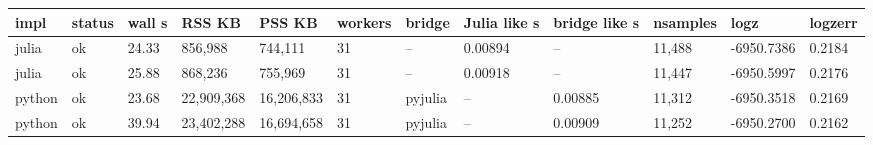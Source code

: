 \begin{tabular}{llllllllllll}
\toprule
impl & status & wall s & RSS KB & PSS KB & workers & bridge & Julia like s & bridge like s & nsamples & logz & logzerr \\
\midrule
julia & ok & 24.33 & 856,988 & 744,111 & 31 & -- & 0.00894 & -- & 11,488 & -6950.7386 & 0.2184 \\
julia & ok & 25.88 & 868,236 & 755,969 & 31 & -- & 0.00918 & -- & 11,447 & -6950.5997 & 0.2176 \\
python & ok & 23.68 & 22,909,368 & 16,206,833 & 31 & pyjulia & -- & 0.00885 & 11,312 & -6950.3518 & 0.2169 \\
python & ok & 39.94 & 23,402,288 & 16,694,658 & 31 & pyjulia & -- & 0.00909 & 11,252 & -6950.2700 & 0.2162 \\
\bottomrule
\end{tabular}
